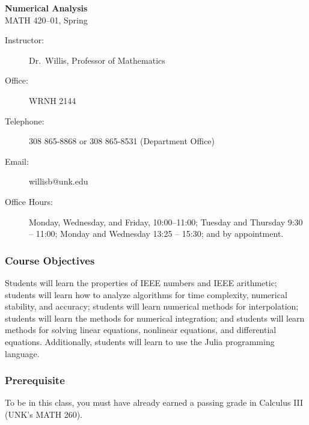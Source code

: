 \documentclass[12pt,fullpage]{article}
\newcounter{ex}\setcounter{ex}{0}
\begin{document}
\large
\begin{center}
    \textbf{Numerical Analysis}  \\
    {MATH 420--01, Spring \ay} \\
\end{center}

\vskip0.25in
\normalsize

\begin{center}
\begin{description}
    \item[Instructor:] Dr.\  Willis, Professor of Mathematics
    \item[Office:]  WRNH 2144 
    \item[Telephone:] 308 865-8868 or 308 865-8531 (Department Office)
   \item[Email:] willisb@unk.edu
   \item[Office Hours:] Monday, Wednesday, and  Friday, \mbox{10:00--11:00}; Tuesday and Thursday 9:30 -- 11:00; Monday and Wednesday 13:25 -- 15:30;  and by appointment.
  
\end{description}
\end{center}



\subsubsection*{Course Objectives}

 Students will learn the properties of IEEE numbers and IEEE arithmetic; students will learn how to analyze algorithms for time complexity, numerical stability,  and accuracy; students will learn numerical methods
for interpolation;  students will learn the methods for numerical integration;  and students will learn methods for solving linear equations, nonlinear equations, and differential equations. Additionally, students will learn to 
use the Julia programming language.

\subsubsection*{Prerequisite}

To be in this class, you must have already earned a passing grade in Calculus III (UNK's MATH 260).
\end{document}
